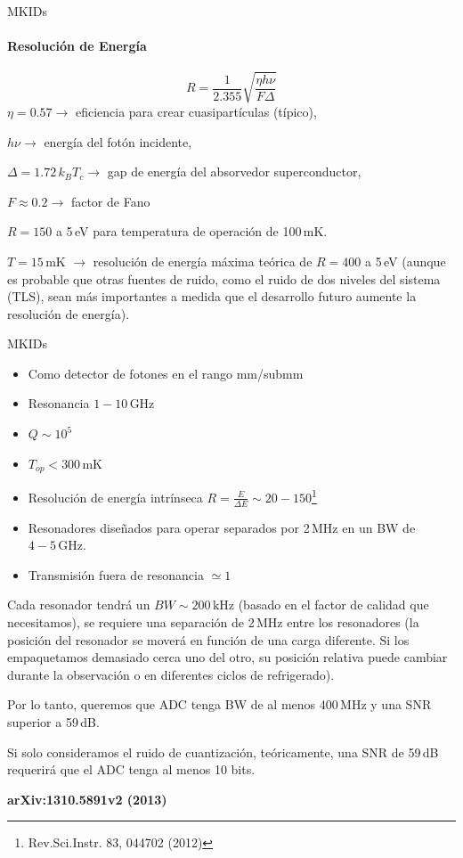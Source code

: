 \documentclass[ignorenonframetext,12pt]{beamer}
\begin{document}
\begin{frame}{MKIDs}
				\framesubtitle{Resolución de Energía}
												\begin{equation*}
																R = \frac{1}{2.355}\sqrt{\frac{\eta h \nu}{F
																\Delta}}
												\end{equation*}
				$\eta = 0.57 \to$ eficiencia para crear cuasipartículas (típico),

				$h\nu \to$ energía del fotón incidente,

				$\Delta = 1.72\,k_BT_c \to$ gap de energía del absorvedor superconductor,

				$F \approx 0.2 \to$ factor de Fano

				$R=150$ a 5\,eV para temperatura de operación de 100\,mK.

				$T = 15$\,mK $\to$ resolución de energía máxima teórica de \alert{$R = 400$ a
				5\,eV} (aunque es probable que otras fuentes de ruido, como el ruido de
				dos niveles del sistema (TLS), sean más importantes a medida que el
				desarrollo futuro aumente	la resolución de energía).

\end{frame}
\begin{frame}{MKIDs}
				\scriptsize{\begin{itemize}
								\item Como detector de fotones en el rango mm/submm
								\item Resonancia  $1-10\,\text{GHz}$
								\item $Q \sim 10^5$
								\item $T_{op} < 300\,\text{mK}$
								\item Resolución de energía intrínseca $R = \frac{E}{\Delta E} \sim
												20-150$\footnote{Rev.Sci.Instr. 83, 044702 (2012)}
								\item Resonadores diseñados para operar separados por 2\,MHz en
												un BW de $4-5\,\text{GHz}$.
								\item Transmisión fuera de resonancia $\simeq 1$
				\end{itemize}
				Cada resonador tendrá un $BW \sim 200\,\text{kHz}$ (\alert{basado en el
				factor de calidad que necesitamos}), se requiere una separación de
				2\,MHz entre los resonadores (la posición del resonador se moverá en
				función de una carga diferente. Si los empaquetamos demasiado cerca uno
				del otro, su posición relativa puede cambiar durante la observación o
				en diferentes ciclos de refrigerado).

				Por lo tanto, queremos que ADC tenga BW de al menos 400\,MHz y una SNR
				superior a 59\,dB.

				Si solo consideramos el ruido de cuantización, teóricamente, una SNR de
				59\,dB requerirá que el ADC tenga al menos 10 bits.
				}
				\tiny{\textbf{arXiv:1310.5891v2 (2013)}}
\end{frame}
\end{document}
